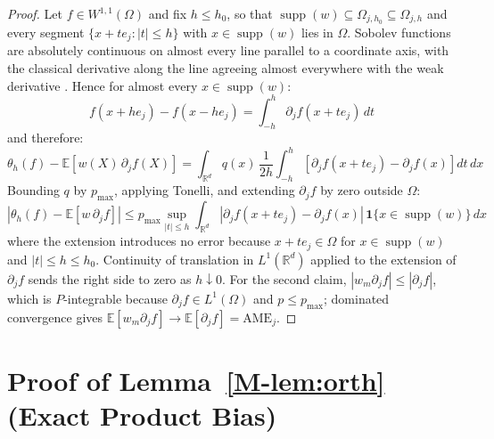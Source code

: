 \documentclass[12pt,a4paper]{article}
\numberwithin{equation}{section}
\theoremstyle{plain}
\theoremstyle{definition}
\newcommand{\R}{\mathbb{R}}
\newcommand{\E}{\mathbb{E}}
\newcommand{\abs}[1]{\left| #1 \right|}
\begin{document}
	\begin{proof}
		Let $f \in W^{1,1}(\Omega)$ and fix $h \leq h_0$, so that
		$\operatorname{supp}(w) \subseteq \Omega_{j,h_0} \subseteq \Omega_{j,h}$ and
		every segment $\{x + t e_j : \abs{t} \leq h\}$ with
		$x \in \operatorname{supp}(w)$ lies in $\Omega$. Sobolev functions are
		absolutely continuous on almost every line parallel to a coordinate axis, with
		the classical derivative along the line agreeing almost everywhere with the
		weak derivative \citep[Section~4.9]{evans2015measure}. Hence for almost every
		$x \in \operatorname{supp}(w)$:
		\begin{equation}
			f(x + h e_j) - f(x - h e_j)
			= \int_{-h}^{h} \partial_j f(x + t e_j)\, dt
		\end{equation}
		and therefore:
		\begin{equation}
			\theta_h(f) - \E\left[w(X)\, \partial_j f(X)\right]
			= \int_{\R^d} q(x)\, \frac{1}{2h} \int_{-h}^{h}
			\left[\partial_j f(x + t e_j) - \partial_j f(x)\right] dt\, dx
		\end{equation}
		Bounding $q$ by $p_{\max}$, applying Tonelli, and extending
		$\partial_j f$ by zero outside $\Omega$:
		\begin{equation}
			\abs{\theta_h(f) - \E\left[w\, \partial_j f\right]}
			\leq p_{\max} \sup_{\abs{t} \leq h}
			\int_{\R^d} \abs{\partial_j f(x + t e_j) - \partial_j f(x)}
			\, \mathbf{1}\{x \in \operatorname{supp}(w)\}\, dx
		\end{equation}
		where the extension introduces no error because $x + t e_j \in \Omega$ for
		$x \in \operatorname{supp}(w)$ and $\abs{t} \leq h \leq h_0$. Continuity of
		translation in $L^1(\R^d)$ applied to the extension of $\partial_j f$ sends
		the right side to zero as $h \downarrow 0$. For the second claim,
		$\abs{w_m \partial_j f} \leq \abs{\partial_j f}$, which is $P$-integrable
		because $\partial_j f \in L^1(\Omega)$ and $p \leq p_{\max}$; dominated
		convergence gives
		$\E[w_m \partial_j f] \to \E[\partial_j f] = \mathrm{AME}_j$.
	\end{proof}
	
	\section{Proof of Lemma~\ref{M-lem:orth} (Exact Product Bias)}
	\label{app:lem_orth}
	
\end{document}
